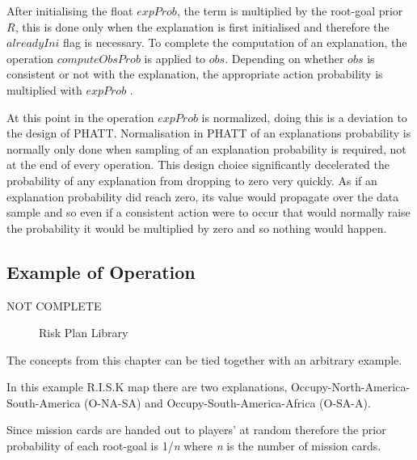 \documentclass[parskip]{cs4rep}
\begin{document}
After initialising the float $expProb$, the term is multiplied by the root-goal prior $R$, this is done only when the explanation is first initialised and therefore the $alreadyIni$ flag is necessary. To complete the computation of an explanation, the operation $computeObsProb$ is applied to $obs$. Depending on whether $obs$ is consistent or not with the explanation, the appropriate action probability is multiplied with $expProb$ .

At this point in the operation $expProb$ is normalized, doing this is a deviation to the design of PHATT. Normalisation in PHATT of an explanations probability is normally only done when sampling of an explanation probability is required, not at the end of every operation. This design choice significantly decelerated the probability of any explanation from dropping to zero very quickly. As if an explanation probability did reach zero, its value would propagate over the data sample and so even if a consistent action were to occur that would normally raise the probability it would be multiplied by zero and so nothing would happen. 

\subsection{Example of Operation}

NOT COMPLETE
\begin{figure}[h]
\caption{Risk Plan Library}
\end{figure}
The concepts from this chapter can be tied together with an arbitrary example.

In this example R.I.S.K map there are two explanations, Occupy-North-America-South-America (O-NA-SA) and Occupy-South-America-Africa (O-SA-A). 

Since mission cards are handed out to players' at random therefore the prior probability of each root-goal is 1/\textit{n} where \textit{n} is the number of mission cards. 
\end{document}
